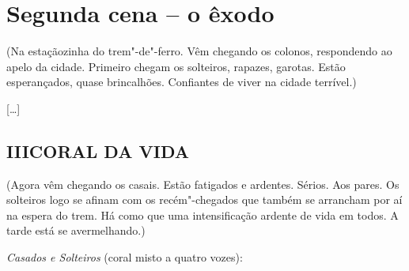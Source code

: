 \chapter{Segunda cena -- o êxodo}

\hfill\parbox{150pt}{
(Na estaçãozinha do trem"-de"-ferro. Vêm chegando os colonos, respondendo
ao apelo da cidade. Primeiro chegam os solteiros, rapazes, garotas.
Estão esperançados, quase brincalhões. Confiantes de viver na cidade
terrível.)
}

{[}\ldots{}{]}

\section*{III\break CORAL DA VIDA}

\hfill\parbox{150pt}{
(Agora vêm chegando os casais. Estão fatigados e ardentes. Sérios. Aos
pares. Os solteiros logo se afinam com os recém"-chegados que também se
arrancham por aí na espera do trem. Há como que uma intensificação
ardente de vida em todos. A tarde está se avermelhando.)
}

\emph{Casados e Solteiros} (coral misto a quatro vozes):

